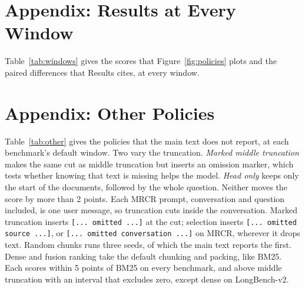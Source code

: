 \documentclass[letterpaper]{article} %
\newcommand{\recipe}{fusion recipe}
\begin{document}
\begin{table}[t]
\centering
\small

\caption{The 20 primary comparisons: the \recipe{} against middle truncation and against position, at every window. $\Delta$ is the paired difference in points, with its 95\% bootstrap interval. $p$ is from a two-sided paired randomization test with 100,000 swaps of the two policies' outcomes, by document set on AA-LCR, by text on LongBench-v2 and by question within each conversation on MRCR. Holm $p$ is corrected across all 20 comparisons; bold marks the significant ones ($< 0.05$).}
\label{tab:primary}
\end{table}

\section{Appendix: Results at Every Window}
Table~\ref{tab:windows} gives the scores that Figure~\ref{fig:policies} plots and the paired differences that Results cites, at every window.

\begin{table}[t]
\centering
\small
\setlength{\tabcolsep}{4pt}

\caption{Scores and paired differences at every window. Scores are accuracy on AA-LCR and LongBench-v2 and exact match on MRCR, in percent. Each difference is in points, with its 95\% bootstrap interval (see Experiments). Full context is the 262K run, in which every prompt fits. The position recipe ran on AA-LCR only, and the dense variants on MRCR at 262K only; the floor is compared on AA-LCR only, because it cannot change a prompt that holds one text, and the oracle with its own 262K run at 32K only.}
\label{tab:windows}
\end{table}

\section{Appendix: Other Policies}
Table~\ref{tab:other} gives the policies that the main text does not report, at each benchmark's default window. Two vary the truncation. \emph{Marked middle truncation} makes the same cut as middle truncation but inserts an omission marker, which tests whether knowing that text is missing helps the model. \emph{Head only} keeps only the start of the documents, followed by the whole question. Neither moves the score by more than 2 points. Each MRCR prompt, conversation and question included, is one user message, so truncation cuts inside the conversation. Marked truncation inserts \texttt{[... omitted ...]} at the cut; selection inserts \texttt{[... omitted source ...]}, or \texttt{[... omitted conversation ...]} on MRCR, wherever it drops text. Random chunks runs three seeds, of which the main text reports the first. Dense and fusion ranking take the default chunking and packing, like BM25. Each scores within 5 points of BM25 on every benchmark, and above middle truncation with an interval that excludes zero, except dense on LongBench-v2.
\end{document}
